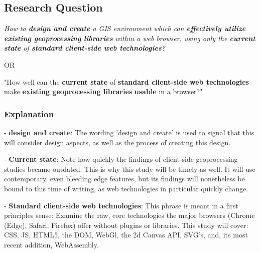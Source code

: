 


\subsection{Research Question}

\textit{How to \textbf{design and create} a GIS environment which can \textbf{effectively utilize} \textbf{existing geoprocessing libraries} within a web browser, using only the \textbf{current state} of \textbf{standard client-side web technologies}?}

OR

"How well can the \textbf{current state} of \textbf{standard client-side web technologies} make \textbf{existing geoprocessing libraries} \textbf{usable} in a browser?"

\subsubsection*{Explanation}


- \textbf{design and create}: The wording 'design and create' is used to signal that this will consider design aspects, as well as the process of creating this design. 

- \textbf{Current state}: Note how quickly the findings of client-side geoprocessing studies became outdated. This is why this study will be timely as well. It will use contemporary, even bleeding edge features, but its findings will nonetheless be bound to this time of writing, as web technologies in particular quickly change. 

- \textbf{Standard client-side web technologies}: This phrase is meant in a first principles sense: Examine the raw, core technologies the major browsers (Chrome (Edge), Safari, Firefox) offer without plugins or libraries. This study will cover: CSS, JS, HTML5, the DOM, WebGl, the 2d Canvas API, SVG's, and, its most recent addition, WebAssembly. 

